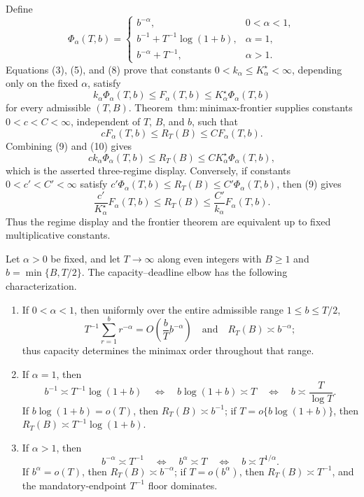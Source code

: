 Define
\[
\Phi_\alpha(T,b)=
\begin{cases}
b^{-\alpha},&0<\alpha<1,\\
b^{-1}+T^{-1}\log(1+b),&\alpha=1,\\
b^{-\alpha}+T^{-1},&\alpha>1.
\end{cases}
\]
Equations (3), (5), and (8) prove that constants \(0<k_\alpha\le K_\alpha^\star<\infty\), depending only on the fixed \(\alpha\), satisfy
\[
k_\alpha\Phi_\alpha(T,b)
\le F_\alpha(T,b)
\le K_\alpha^\star\Phi_\alpha(T,b) \tag{9}
\]
for every admissible \((T,B)\).  Theorem~\(\mathrm{thm:minimax\text{-}frontier}\) supplies constants \(0<c<C<\infty\), independent of \(T\), \(B\), and \(b\), such that
\[
cF_\alpha(T,b)\le R_T(B)\le CF_\alpha(T,b). \tag{10}
\]
Combining (9) and (10) gives
\[
ck_\alpha\Phi_\alpha(T,b)
\le R_T(B)
\le CK_\alpha^\star\Phi_\alpha(T,b), \tag{11}
\]
which is the asserted three-regime display.  Conversely, if constants \(0<c'<C'<\infty\) satisfy \(c'\Phi_\alpha(T,b)\le R_T(B)\le C'\Phi_\alpha(T,b)\), then (9) gives
\[
\frac{c'}{K_\alpha^\star}F_\alpha(T,b)
\le R_T(B)
\le \frac{C'}{k_\alpha}F_\alpha(T,b). \tag{12}
\]
Thus the regime display and the frontier theorem are equivalent up to fixed multiplicative constants.

Let \(\alpha>0\) be fixed, and let \(T\to\infty\) along even integers with \(B\ge1\) and \(b=\min\{B,T/2\}\).  The capacity--deadline elbow has the following characterization.
\begin{enumerate}
\item If \(0<\alpha<1\), then uniformly over the entire admissible range \(1\le b\le T/2\),
\[
T^{-1}\sum_{r=1}^{b}r^{-\alpha}=O\!\left(\frac bT b^{-\alpha}\right)
\quad\text{and}\quad
R_T(B)\asymp b^{-\alpha};
\]
thus capacity determines the minimax order throughout that range.
\item If \(\alpha=1\), then
\[
b^{-1}\asymp T^{-1}\log(1+b)
\quad\Longleftrightarrow\quad
b\log(1+b)\asymp T
\quad\Longleftrightarrow\quad
b\asymp \frac{T}{\log T}.
\]
If \(b\log(1+b)=o(T)\), then \(R_T(B)\asymp b^{-1}\); if \(T=o\{b\log(1+b)\}\), then \(R_T(B)\asymp T^{-1}\log(1+b)\).
\item If \(\alpha>1\), then
\[
b^{-\alpha}\asymp T^{-1}
\quad\Longleftrightarrow\quad
b^\alpha\asymp T
\quad\Longleftrightarrow\quad
b\asymp T^{1/\alpha}.
\]
If \(b^\alpha=o(T)\), then \(R_T(B)\asymp b^{-\alpha}\); if \(T=o(b^\alpha)\), then \(R_T(B)\asymp T^{-1}\), and the mandatory-endpoint \(T^{-1}\) floor dominates.
\end{enumerate}

